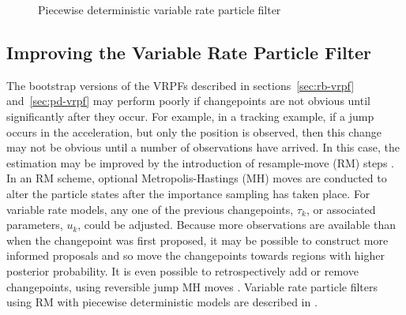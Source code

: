 \documentclass[journal]{IEEEtran}
\begin{document}
\begin{figure}
\label{alg:VRPF}
\caption{Piecewise deterministic variable rate particle filter}
\end{figure}



\subsection{Improving the Variable Rate Particle Filter}

The bootstrap versions of the VRPFs described in sections~\ref{sec:rb-vrpf} and~\ref{sec:pd-vrpf} may perform poorly if changepoints are not obvious until significantly after they occur. For example, in a tracking example, if a jump occurs in the acceleration, but only the position is observed, then this change may not be obvious until a number of observations have arrived. In this case, the estimation may be improved by the introduction of resample-move (RM) steps \cite{Gilks2001}. In an RM scheme, optional Metropolis-Hastings (MH) moves are conducted to alter the particle states after the importance sampling has taken place. For variable rate models, any one of the previous changepoints, $\tau_k$, or associated parameters, $u_k$, could be adjusted. Because more observations are available than when the changepoint was first proposed, it may be possible to construct more informed proposals and so move the changepoints towards regions with higher posterior probability. It is even possible to retrospectively add or remove changepoints, using reversible jump MH moves \cite{Green1995}. Variable rate particle filters using RM with piecewise deterministic models are described in \cite{Whiteley2011,Gilholm2008}.
\end{document}
